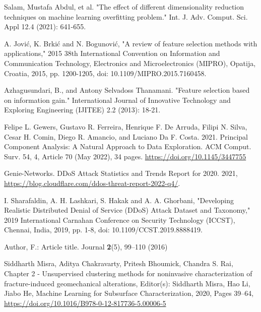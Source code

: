 \documentclass[runningheads]{llncs}
\begin{document}
\begin{thebibliography}{8}
Salam, Mustafa Abdul, et al. "The effect of different dimensionality reduction techniques on machine learning overfitting problem." Int. J. Adv. Comput. Sci. Appl 12.4 (2021): 641-655.

A. Jović, K. Brkić and N. Bogunović, "A review of feature selection methods with applications," 2015 38th International Convention on Information and Communication Technology, Electronics and Microelectronics (MIPRO), Opatija, Croatia, 2015, pp. 1200-1205, doi: 10.1109/MIPRO.2015.7160458.

Azhagusundari, B., and Antony Selvadoss Thanamani. "Feature selection based on information gain." International Journal of Innovative Technology and Exploring Engineering (IJITEE) 2.2 (2013): 18-21.

Felipe L. Gewers, Gustavo R. Ferreira, Henrique F. De Arruda, Filipi N. Silva, Cesar H. Comin, Diego R. Amancio, and Luciano Da F. Costa. 2021. Principal Component Analysis: A Natural Approach to Data Exploration. ACM Comput. Surv. 54, 4, Article 70 (May 2022), 34 pages. \url{https://doi.org/10.1145/3447755}

Genie-Networks. DDoS Attack Statistics and Trends Report for 2020. 2021, \url{https://blog.cloudflare.com/ddos-threat-report-2022-q4/}.

I. Sharafaldin, A. H. Lashkari, S. Hakak and A. A. Ghorbani, "Developing Realistic Distributed Denial of Service (DDoS) Attack Dataset and Taxonomy," 2019 International Carnahan Conference on Security Technology (ICCST), Chennai, India, 2019, pp. 1-8, doi: 10.1109/CCST.2019.8888419.

Author, F.: Article title. Journal \textbf{2}(5), 99--110 (2016)

Siddharth Misra, Aditya Chakravarty, Pritesh Bhoumick, Chandra S. Rai,
Chapter 2 - Unsupervised clustering methods for noninvasive characterization of fracture-induced geomechanical alterations,
Editor(s): Siddharth Misra, Hao Li, Jiabo He,
Machine Learning for Subsurface Characterization,
2020, Pages 39--64, \url{https://doi.org/10.1016/B978-0-12-817736-5.00006-5}


\end{thebibliography}
\end{document}

